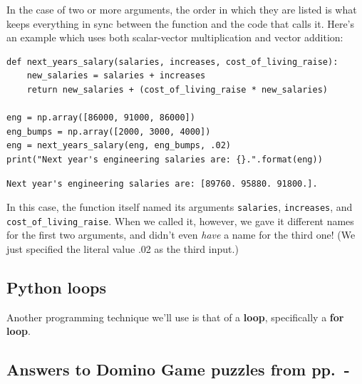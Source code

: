 In the case of two or more arguments, the order in which they are listed is
what keeps everything in sync between the function and the code that calls it.
Here's an example which uses both scalar-vector multiplication and vector
addition:

\begin{Verbatim}[fontsize=\footnotesize,samepage=true,frame=single,framesep=3mm]
def next_years_salary(salaries, increases, cost_of_living_raise):
    new_salaries = salaries + increases
    return new_salaries + (cost_of_living_raise * new_salaries)

eng = np.array([86000, 91000, 86000])
eng_bumps = np.array([2000, 3000, 4000])
eng = next_years_salary(eng, eng_bumps, .02)
print("Next year's engineering salaries are: {}.".format(eng))
\end{Verbatim}
\vspace{-.2in}

\begin{Verbatim}[fontsize=\footnotesize,samepage=true,frame=leftline,framesep=5mm,framerule=1mm]
Next year's engineering salaries are: [89760. 95880. 91800.].
\end{Verbatim}

In this case, the function itself named its arguments \texttt{salaries},
\texttt{increases}, and \texttt{cost\_of\_living\_raise}. When we called it,
however, we gave it different names for the first two arguments, and didn't
even \textit{have} a name for the third one! (We just specified the literal
value .02 as the third input.)

\subsection*{Python loops}


Another programming technique we'll use is that of a \textbf{loop},
specifically a \textbf{for loop}.

\vfill

\pagebreak
\subsection*{Answers to Domino Game puzzles from
pp.~\pageref{startDominoPuzzles}-\pageref{endDominoPuzzes}}
\label{dominoPuzzleAnswers}

